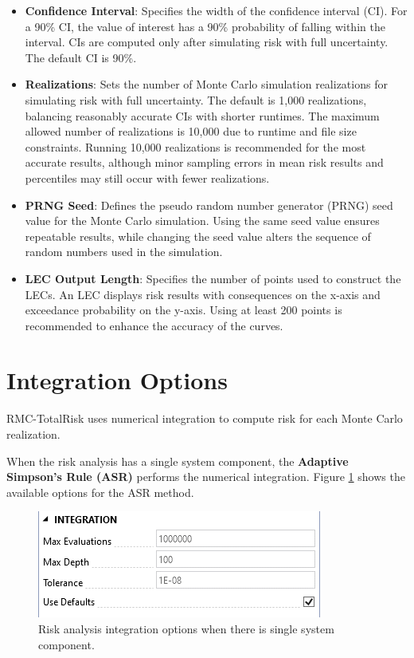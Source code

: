 \documentclass[
]{book}
\begin{document}
\begin{itemize}
\item
  \textbf{Confidence Interval}: Specifies the width of the confidence interval (CI). For a 90\% CI, the value of interest has a 90\% probability of falling within the interval. CIs are computed only after simulating risk with full uncertainty. The default CI is 90\%.
\item
  \textbf{Realizations}: Sets the number of Monte Carlo simulation realizations for simulating risk with full uncertainty. The default is 1,000 realizations, balancing reasonably accurate CIs with shorter runtimes. The maximum allowed number of realizations is 10,000 due to runtime and file size constraints. Running 10,000 realizations is recommended for the most accurate results, although minor sampling errors in mean risk results and percentiles may still occur with fewer realizations.
\item
  \textbf{PRNG Seed}: Defines the pseudo random number generator (PRNG) seed value for the Monte Carlo simulation. Using the same seed value ensures repeatable results, while changing the seed value alters the sequence of random numbers used in the simulation.
\item
  \textbf{LEC Output Length}: Specifies the number of points used to construct the LECs. An LEC displays risk results with consequences on the x-axis and exceedance probability on the y-axis. Using at least 200 points is recommended to enhance the accuracy of the curves.
\end{itemize}

\hypertarget{integration-options}{%
\section{Integration Options}\label{integration-options}}

RMC-TotalRisk uses numerical integration to compute risk for each Monte Carlo realization.

When the risk analysis has a single system component, the \textbf{Adaptive Simpson's Rule (ASR)} performs the numerical integration. Figure \ref{fig:figure-126} shows the available options for the ASR method.

\begin{figure}

{\centering \includegraphics{images/figure126} 

}

\caption{Risk analysis integration options when there is single system component.}\label{fig:figure-126}
\end{figure}
\end{document}
